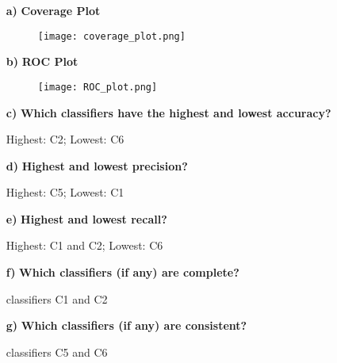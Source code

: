 \begin{itemize}
  \item[ \textbf{a)} ] \textbf{Coverage Plot} 
    \begin{figure}[H]
      \centering
      \texttt{[image: coverage\_plot.png]}
    \end{figure}
  \item[ \textbf{b)} ]  \textbf{ROC Plot} 
    \begin{figure}[H]
      \centering
      \texttt{[image: ROC\_plot.png]}
    \end{figure}
  \item[ \textbf{c)} ] \textbf{Which classifiers have the highest and lowest
    accuracy?} 
    \par Highest: C2; Lowest: C6
  \item[ \textbf{d)} ] \textbf{Highest and lowest precision?} 
    \par Highest: C5; Lowest: C1
  \item[ \textbf{e)} ]  \textbf{Highest and lowest recall?} 
    \par Highest: C1 and C2; Lowest: C6
  \item[ \textbf{f)}] \textbf{Which classifiers (if any) are complete?} 
    \par classifiers C1 and C2 
  \item[ \textbf{g)}] \textbf{Which classifiers (if any) are consistent?} 
    \par classifiers C5 and C6 
\end{itemize}



